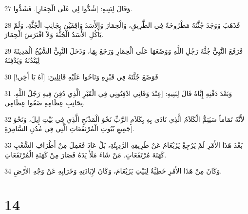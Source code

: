 \par 27 وَقَالَ لِبَنِيهِ: [شُدُّوا لِي عَلَى الْحِمَارِ]. فَشَدُّوا.
\par 28 فَذَهَبَ وَوَجَدَ جُثَّتَهُ مَطْرُوحَةً فِي الطَّرِيقِ، وَالْحِمَارَ وَالأَسَدَ وَاقِفَيْنِ بِجَانِبِ الْجُثَّةِ، وَلَمْ يَأْكُلِ الأَسَدُ الْجُثَّةَ وَلاَ افْتَرَسَ الْحِمَارَ.
\par 29 فَرَفَعَ النَّبِيُّ جُثَّةَ رَجُلِ اللَّهِ وَوَضَعَهَا عَلَى الْحِمَارِ وَرَجَعَ بِهَا، وَدَخَلَ النَّبِيُّ الشَّيْخُ الْمَدِينَةَ لِيَنْدُبَهُ وَيَدْفِنَهُ
\par 30 فَوَضَعَ جُثَّتَهُ فِي قَبْرِهِ وَنَاحُوا عَلَيْهِ قَائِلِينَ: [آهُ يَا أَخِي!]
\par 31 وَبَعْدَ دَفْنِهِ إِيَّاهُ قَالَ لِبَنِيهِ: [عِنْدَ وَفَاتِي ادْفِنُونِي فِي الْقَبْرِ الَّذِي دُفِنَ فِيهِ رَجُلُ اللَّهِ. بِجَانِبِ عِظَامِهِ ضَعُوا عِظَامِي.
\par 32 لأَنَّهُ تَمَاماً سَيَتِمُّ الْكَلاَمُ الَّذِي نَادَى بِهِ بِكَلاَمِ الرَّبِّ نَحْوَ الْمَذْبَحِ الَّذِي فِي بَيْتِ إِيلَ، وَنَحْوَ جَمِيعِ بُيُوتِ الْمُرْتَفَعَاتِ الَّتِي فِي مُدُنِ السَّامِرَةِ].
\par 33 بَعْدَ هَذَا الأَمْرِ لَمْ يَرْجِعْ يَرُبْعَامُ عَنْ طَرِيقِهِ الرَّدِيِئَةِ، بَلْ عَادَ فَعَمِلَ مِنْ أَطْرَافِ الشَّعْبِ كَهَنَةَ مُرْتَفَعَاتٍ. مَنْ شَاءَ مَلَأَ يَدَهُ فَصَارَ مِنْ كَهَنَةِ الْمُرْتَفَعَاتِ.
\par 34 وَكَانَ مِنْ هَذَا الأَمْرِ خَطِيَّةٌ لِبَيْتِ يَرُبْعَامَ، وَكَانَ لإِبَادَتِهِ وَخَرَابِهِ عَنْ وَجْهِ الأَرْضِ.

\chapter{14}

